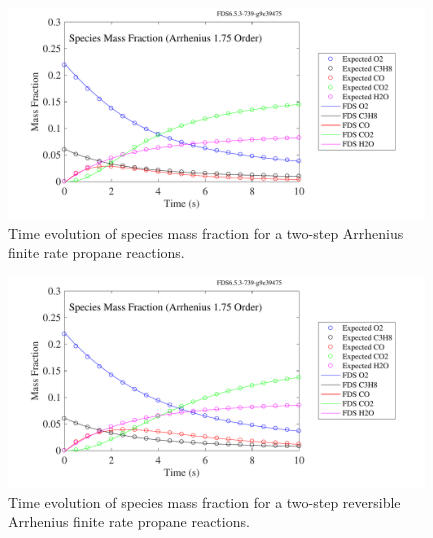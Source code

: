 \documentclass[11pt]{book}
\begin{document}
\begin{figure}[h!]
\centering
\includegraphics[height=2.2in]{SCRIPT_FIGURES/reactionrate_arrhenius_1p75order_2step}
\caption[Species evolution in a 1.75-order 2-step finite rate reaction]{Time evolution of species mass fraction for a two-step Arrhenius finite rate propane reactions.}
\label{fig:Arrhenius_175Order_2step}
\end{figure}

\begin{figure}[h!]
\centering
\includegraphics[height=2.2in]{SCRIPT_FIGURES/reactionrate_arrhenius_1p75order_2stepr}
\caption[Species evolution in a 1.75-order 2-step reversible finite rate reaction]{Time evolution of species mass fraction for a two-step reversible Arrhenius finite rate propane reactions.}
\label{fig:Arrhenius_175Order_2stepR}
\end{figure}
\end{document}

